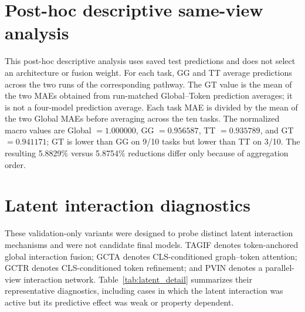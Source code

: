 \documentclass[a4paper,fleqn]{cas-sc}
\begin{document}
\FloatBarrier
\appendix
\setcounter{topnumber}{5}
\setcounter{bottomnumber}{5}
\setcounter{totalnumber}{10}
\renewcommand{\topfraction}{0.95}
\renewcommand{\bottomfraction}{0.95}
\renewcommand{\textfraction}{0.05}
\renewcommand{\floatpagefraction}{0.10}
\section{Post-hoc descriptive same-view analysis}\label{app:sameview}
This post-hoc descriptive analysis uses saved test predictions and does not select an architecture or fusion weight. For each task, GG and TT average predictions across the two runs of the corresponding pathway. The GT value is the mean of the two MAEs obtained from run-matched Global--Token prediction averages; it is not a four-model prediction average. Each task MAE is divided by the mean of the two Global MAEs before averaging across the ten tasks. The normalized macro values are Global $=1.000000$, GG $=0.956587$, TT $=0.935789$, and GT $=0.941171$; GT is lower than GG on 9/10 tasks but lower than TT on 3/10. The resulting 5.8829\% versus 5.8754\% reductions differ only because of aggregation order.

\section{Latent interaction diagnostics}\label{app:latent}
These validation-only variants were designed to probe distinct latent interaction mechanisms and were not candidate final models. TAGIF denotes token-anchored global interaction fusion; GCTA denotes CLS-conditioned graph--token attention; GCTR denotes CLS-conditioned token refinement; and PVIN denotes a parallel-view interaction network. Table~\ref{tab:latent_detail} summarizes their representative diagnostics, including cases in which the latent interaction was active but its predictive effect was weak or property dependent.
\end{document}
